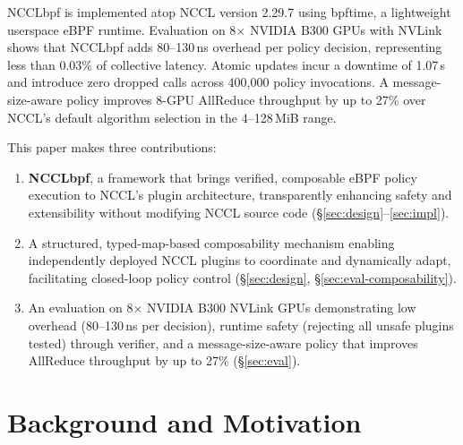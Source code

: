 \documentclass[sigplan,10pt]{acmart}
\newcommand{\sysname}{NCCLbpf\xspace}
\newcommand{\us}{\,\textmu{}s\xspace}
\newcommand{\ns}{\,ns\xspace}
\begin{document}
\sysname is implemented atop NCCL version 2.29.7 using bpftime, a
lightweight userspace eBPF runtime. Evaluation on 8$\times$
NVIDIA B300 GPUs with NVLink shows that \sysname adds 80--130\ns
overhead per policy decision, representing less than 0.03\% of
collective latency. Atomic updates incur a downtime of
1.07\us and introduce zero dropped calls across 400{,}000 policy
invocations. A message-size-aware policy improves 8-GPU
AllReduce throughput by up to 27\% over NCCL's default algorithm
selection in the 4--128\,MiB range.

This paper makes three contributions:

\begin{enumerate}[leftmargin=*,topsep=2pt,itemsep=1pt]
\item \textbf{\sysname}, a framework that brings verified,
composable eBPF policy execution to NCCL's plugin architecture,
transparently enhancing safety and extensibility without modifying
NCCL source code
(\S\ref{sec:design}--\ref{sec:impl}).

\item A structured, typed-map-based composability mechanism
enabling independently deployed NCCL plugins to coordinate and
dynamically adapt, facilitating closed-loop policy control
(\S\ref{sec:design}, \S\ref{sec:eval-composability}).

\item An evaluation on 8$\times$ NVIDIA B300 NVLink GPUs
demonstrating low overhead (80--130\ns per decision),
runtime safety (rejecting all unsafe plugins tested) through verifier, and a
message-size-aware policy that improves AllReduce throughput by
up to 27\% (\S\ref{sec:eval}).
\end{enumerate}

\section{Background and Motivation}
\label{sec:motivation}
\end{document}
